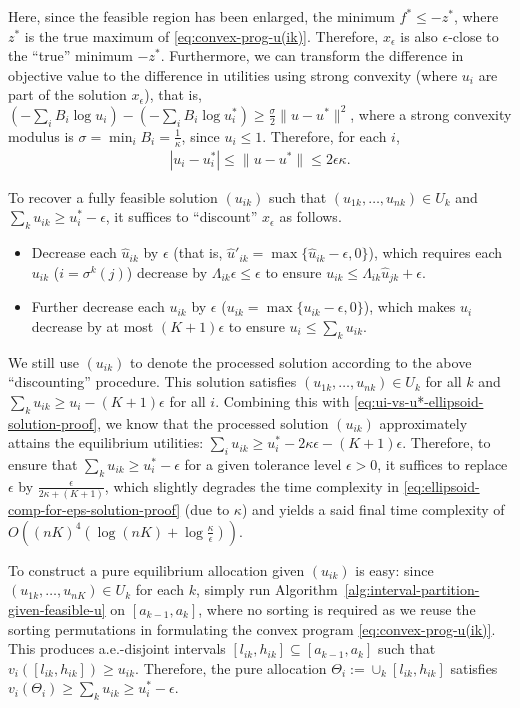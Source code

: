 Here, since the feasible region has been enlarged, the minimum $f^* \leq -z^*$, where $z^*$ is the true maximum of \eqref{eq:convex-prog-u(ik)}. Therefore, $x_\epsilon$ is also $\epsilon$-close to the ``true'' minimum $-z^*$. 
Furthermore, we can transform the difference in objective value to the difference in utilities using strong convexity (where $u_i$ are part of the solution $x_\epsilon$), that is, 
	$\left(-\sum_i B_i \log u_i\right) - \left( -\sum_i B_i \log u^*_i \right) \geq \frac{\sigma}{2}\|u-u^*\|^2$, 
where a strong convexity modulus is $\sigma = \min_i B_i = \frac{1}{\kappa}$, since $u_i \leq 1$.
Therefore, for each $i$,
\begin{align}
	|u_i - u^*_i| \leq \|u-u^*\| \leq 2\epsilon \kappa.
	\label{eq:ui-vs-u*-ellipsoid-solution-proof}
\end{align}

To recover a fully feasible solution $(u_{ik})$ such that $(u_{1k}, \dots, u_{nk}) \in U_k$ and $\sum_k u_{ik} \geq u^*_i - \epsilon$, it suffices to ``discount'' $x_\epsilon$ as follows.
\begin{itemize}
	\item Decrease each $\hat{u}_{ik}$ by $\epsilon$ (that is, $\hat{u}'_{ik} = \max\{ \hat{u}_{ik}-\epsilon,0 \}$), which requires each $u_{ik}$ ($i=\sigma^k(j)$) decrease by $\Lambda_{ik} \epsilon\leq \epsilon$ to ensure $u_{ik} \leq \Lambda_{ik} \hat{u}_{jk} + \epsilon$.
	\item Further decrease each $u_{ik}$ by $\epsilon$ ($u_{ik} = \max\{ u_{ik} - \epsilon, 0 \}$), which makes $u_i$ decrease by at most $(K+1) \epsilon$ to ensure $ u_i \leq \sum_k u_{ik}$.
\end{itemize}
We still use $(u_{ik})$ to denote the processed solution according to the above ``discounting'' procedure. This solution satisfies $(u_{1k}, \dots, u_{nk})\in U_k$ for all $k$ and $\sum_k u_{ik} \geq u_i - (K+1)\epsilon$ for all $i$. Combining this with \eqref{eq:ui-vs-u*-ellipsoid-solution-proof}, we know that the processed solution $(u_{ik})$ approximately attains the equilibrium utilities:
$\sum_i u_{ik} \geq u^*_i - 2\kappa \epsilon - (K+1)\epsilon$.
Therefore, to ensure that $\sum_k u_{ik} \geq u^*_i - \epsilon$ for a given tolerance level $\epsilon>0$, it suffices to replace $\epsilon$ by $\frac{\epsilon}{2\kappa+ (K+1)}$, which slightly degrades the time complexity in \eqref{eq:ellipsoid-comp-for-eps-solution-proof}  (due to $\kappa$) and yields a said final time complexity of 
$O\left( (nK)^4 \left(\log (nK) + \log \frac{\kappa}{\epsilon}  \right) \right)$.

To construct a pure equilibrium allocation given $(u_{ik})$ is easy: since $(u_{1k}, \dots, u_{nK})\in U_k$ for each $k$, simply run Algorithm~\ref{alg:interval-partition-given-feasible-u} on $[a_{k-1}, a_k]$, where no sorting is required as we reuse the sorting permutations in formulating the convex program \eqref{eq:convex-prog-u(ik)}. This produces a.e.-disjoint intervals $[l_{ik}, h_{ik}]\subseteq [a_{k-1}, a_k]$ such that $v_i([l_{ik}, h_{ik}]) \geq u_{ik}$. Therefore, the pure allocation $\Theta_i := \cup_k [l_{ik}, h_{ik}]$ satisfies
$v_i(\Theta_i) \geq \sum_k u_{ik} \geq u^*_i - \epsilon$. 
